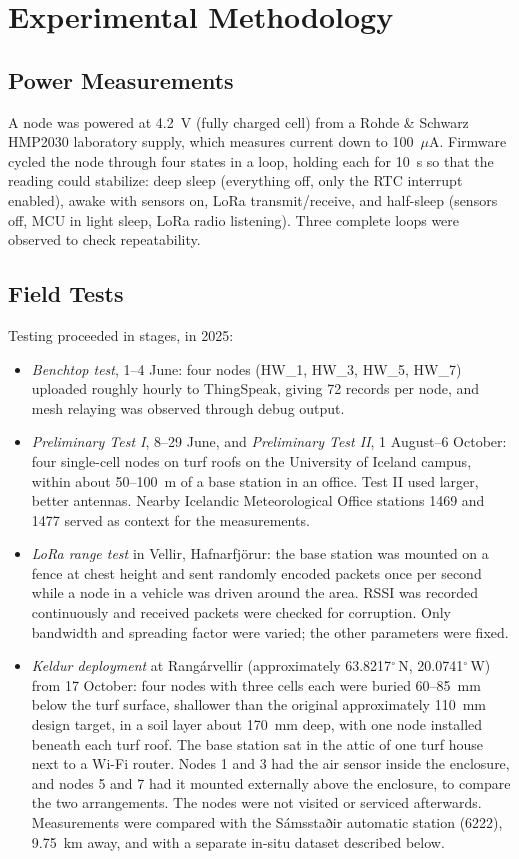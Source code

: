 \section{Experimental Methodology}
\subsection{Power Measurements}
A node was powered at 4.2~V (fully charged cell) from a Rohde \& Schwarz HMP2030 laboratory supply, which measures current down to 100~$\mu$A. Firmware cycled the node through four states in a loop, holding each for 10~s so that the reading could stabilize: deep sleep (everything off, only the RTC interrupt enabled), awake with sensors on, LoRa transmit/receive, and half-sleep (sensors off, MCU in light sleep, LoRa radio listening). Three complete loops were observed to check repeatability.

\subsection{Field Tests}
Testing proceeded in stages, in 2025:
\begin{itemize}
\item \textit{Benchtop test}, 1--4 June: four nodes (HW\_1, HW\_3, HW\_5, HW\_7) uploaded roughly hourly to ThingSpeak, giving 72 records per node, and mesh relaying was observed through debug output.
\item \textit{Preliminary Test I}, 8--29 June, and \textit{Preliminary Test II}, 1 August--6 October: four single-cell nodes on turf roofs on the University of Iceland campus, within about 50--100~m of a base station in an office. Test II used larger, better antennas. Nearby Icelandic Meteorological Office stations 1469 and 1477 served as context for the measurements.
\item \textit{LoRa range test} in Vellir, Hafnarfj{\"o}r{\dh}ur: the base station was mounted on a fence at chest height and sent randomly encoded packets once per second while a node in a vehicle was driven around the area. RSSI was recorded continuously and received packets were checked for corruption. Only bandwidth and spreading factor were varied; the other parameters were fixed.
\item \textit{Keldur deployment} at Rangárvellir (approximately 63.8217$^\circ$\,N, 20.0741$^\circ$\,W) from 17 October: four nodes with three cells each were buried 60--85~mm below the turf surface, shallower than the original approximately 110~mm design target, in a soil layer about 170~mm deep, with one node installed beneath each turf roof. The base station sat in the attic of one turf house next to a Wi-Fi router. Nodes 1 and 3 had the air sensor inside the enclosure, and nodes 5 and 7 had it mounted externally above the enclosure, to compare the two arrangements. The nodes were not visited or serviced afterwards. Measurements were compared with the Sámsstaðir automatic station (6222), 9.75~km away, and with a separate in-situ dataset described below.
\end{itemize}

